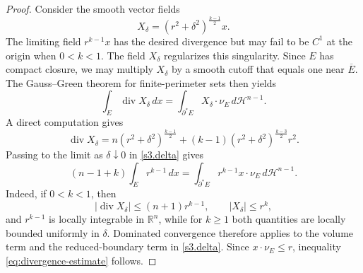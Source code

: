 \documentclass[10pt,a4paper]{amsart}
\numberwithin{equation}{section}
\newcommand{\calH}{\mathcal H}
\newcommand{\diver}{\operatorname{div}}
\begin{document}
\begin{proof}
Consider the smooth vector fields
\begin{equation*}
    X_\delta=(r^2+\delta^2)^{\frac{k-1}{2}}x.
\end{equation*}
The limiting field $r^{k-1}x$ has the desired divergence but may fail to be $C^1$ at the origin when $0<k<1$.  The field $X_\delta$ regularizes this singularity.  Since $E$ has compact closure, we may multiply $X_\delta$ by a smooth cutoff that equals one near $\overline E$.  The Gauss--Green theorem for finite-perimeter sets \cite[Theorem~15.9]{Maggi2012} then yields
\begin{equation}\label{s3.delta}
\int_E\diver X_\delta\,dx
=\int_{\partial^*E} X_\delta\cdot\nu_E\,d\calH^{n-1}.
\end{equation}
A direct computation gives
\begin{equation*}
    \diver X_{\delta} = n \left( r^2 + \delta^2 \right)^{\frac{k-1}{2}} + (k-1)\left( r^2 + \delta^2 \right)^{\frac{k-3}{2}}r^2.
\end{equation*}
Passing to the limit as $\delta\downarrow 0$ in \eqref{s3.delta} gives
\begin{equation}\label{eq:weighted-divergence-identity}
    (n-1+k)\int_E r^{k-1}\,dx
    =\int_{\partial^*E}r^{k-1}x\cdot\nu_E\,d\calH^{n-1}.
\end{equation}
Indeed, if $0<k<1$, then
\begin{equation*}
    |\diver X_\delta|  \leq (n+1) r^{k-1},
    \qquad
    |X_\delta|\leq r^k,
\end{equation*}
and $r^{k-1}$ is locally integrable in $\mathbb{R}^n$, while for $k\geq1$ both quantities are locally bounded uniformly in $\delta$.  Dominated convergence therefore applies to the volume term and the reduced-boundary term in \eqref{s3.delta}. Since $x\cdot\nu_E\leq r$, inequality \eqref{eq:divergence-estimate} follows.



\end{proof}
\end{document}
